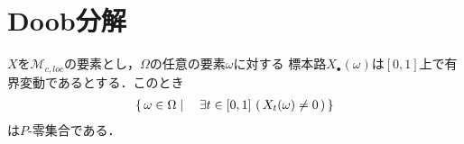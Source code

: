 \section{Doob分解}
	
	\begin{screen}
		\begin{thm}[有界変動な局所マルチンゲールは定数]
			$X$を$\mathscr{M}_{c,loc}$の要素とし，$\Omega$の任意の要素$\omega$に対する
			標本路$X_{\bullet}(\omega)$は$[0,1]$上で有界変動であるとする．このとき
			\begin{align}
				\left\{\, \omega \in \Omega \mid \quad \exists t \in [0,1]\,
				\left(\, X_{t}(\omega) \neq 0\, \right)\, \right\}
			\end{align}
			は$P$-零集合である．
		\end{thm}
	\end{screen}
	
